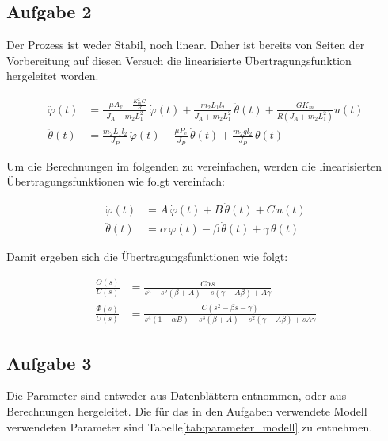 \subsection{Aufgabe 2}\label{sub:A2}

Der Prozess ist weder Stabil, noch linear. Daher ist bereits von Seiten der Vorbereitung auf diesen Versuch die linearisierte Übertragungsfunktion hergeleitet worden. 

\begin{align}
	\ddot{\varphi}(t) &= 	\frac{-\mu A_v - \frac{K_m^2 G}{R}}{J_A + m_2 L_1^2} \, \dot{\varphi}(t) 	+ \frac{m_2 L_1 l_2}{J_A + m_2 L_1^2} \, \ddot{\theta}(t) + \frac{G K_m}{R \left(J_A + m_2 L_1^2\right)} u(t) \\[10pt]
	\ddot{\theta}(t) &= \frac{m_2 L_1 l_2}{J_P} \, \ddot{\varphi}(t) - \frac{\mu P_v}{J_P} \, \dot{\theta}(t) + \frac{m_2 g l_2}{J_P} \, \theta(t)
	\end{align}

Um die Berechnungen im folgenden zu vereinfachen, werden die linearisierten Übertragungsfunktionen wie folgt vereinfach: 

\begin{align}
	\ddot{\varphi}(t) &= 	A \, \dot{\varphi}(t) 	+ B \, \ddot{\theta}(t) +C \, u(t) \\[10pt]
	\ddot{\theta}(t) &= \alpha \, {\varphi}(t) -\beta \, \dot{\theta}(t) + \gamma \, \theta(t)
	\end{align}

Damit ergeben sich die Übertragungsfunktionen wie folgt: 

\begin{align}
	\frac{\Theta(s)}{U(s)} & = \frac{C \alpha s} {s^3 - s^2 (\beta + A) - s (\gamma - A \beta) + A \gamma }                                      \\[10pt]
	\frac{\Phi (s)}{U (s)} & =  \frac{C (s^2 - \beta s - \gamma) } {s^4 (1 - \alpha B) - s^3 (\beta + A ) - s^2 (\gamma - A \beta) + s A \gamma}
\end{align}


\subsection{Aufgabe 3}

Die Parameter sind entweder aus Datenblättern entnommen, oder aus Berechnungen hergeleitet.
Die für das in den Aufgaben verwendete Modell verwendeten Parameter sind Tabelle\ref{tab:parameter_modell} zu entnehmen. 

